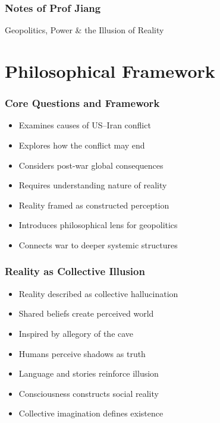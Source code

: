 \begin{frame}[fragile]\frametitle{Notes of Prof Jiang}
\begin{center}
{\Large Geopolitics, Power \& the Illusion of Reality}
\end{center}
\end{frame}

\section{Philosophical Framework}

\begin{frame}[fragile]\frametitle{Core Questions and Framework}
\begin{itemize}
\item Examines causes of US–Iran conflict
\item Explores how the conflict may end
\item Considers post-war global consequences
\item Requires understanding nature of reality
\item Reality framed as constructed perception
\item Introduces philosophical lens for geopolitics
\item Connects war to deeper systemic structures
\end{itemize}
\end{frame}

\begin{frame}[fragile]\frametitle{Reality as Collective Illusion}
\begin{itemize}
\item Reality described as collective hallucination
\item Shared beliefs create perceived world
\item Inspired by allegory of the cave
\item Humans perceive shadows as truth
\item Language and stories reinforce illusion
\item Consciousness constructs social reality
\item Collective imagination defines existence
\end{itemize}
\end{frame}

